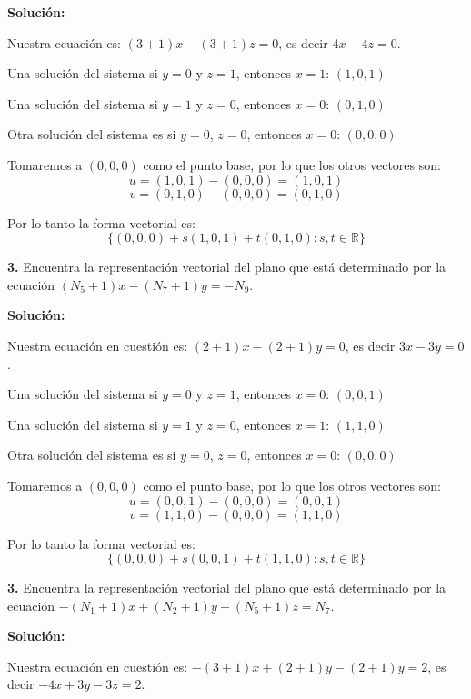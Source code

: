 \documentclass{article}
\begin{document}
\textbf{Solución:}
\vspace{10pt}

Nuestra ecuación es: $(3 +1)x-(3 +1)z = 0$, es decir $4x-4z = 0$.


Una solución del sistema si $y = 0$  y $z = 1$, entonces $x =1$: $(1,0,1)$


Una solución del sistema si $y = 1$  y $z = 0$, entonces $x =0$: $(0,1,0)$


Otra solución del sistema es si $y=0$, $z = 0$, entonces $x =0$: $(0,0,0)$


Tomaremos a $(0,0,0)$ como el punto base, por lo que los otros vectores son:
$$u = (1,0,1)-(0,0,0) = (1,0,1)$$
$$v = (0,1,0)-(0,0,0) = (0,1,0)$$

Por lo tanto la forma vectorial es:
$$\{(0,0,0)+s(1,0,1)+t(0,1,0): s,t \in \mathbb{R}\}$$
\vspace{10pt}

\textbf{3.} Encuentra la representación vectorial del plano que está determinado por la ecuación 
$(N_5 + 1)x - (N_7 + 1)y = -N_9$.
\vspace{10pt}

\textbf{Solución:}
\vspace{10pt}

Nuestra ecuación en cuestión es: $(2 + 1)x - (2 + 1)y = 0$, es decir $3x-3y= 0$.
 

Una solución del sistema si $y = 0$  y $z = 1$, entonces $x =0$: $(0,0,1)$


Una solución del sistema si $y = 1$  y $z = 0$, entonces $x =1$: $(1,1,0)$


Otra solución del sistema es si $y=0$, $z = 0$, entonces $x =0$: $(0,0,0)$


Tomaremos a $(0,0,0)$ como el punto base, por lo que los otros vectores son:
$$u = (0,0,1)-(0,0,0) = (0,0,1)$$
$$v = (1,1,0)-(0,0,0) = (1,1,0)$$

Por lo tanto la forma vectorial es:
$$\{(0,0,0)+s(0,0,1)+t(1,1,0): s,t \in \mathbb{R}\}$$
\vspace{10pt}

\textbf{3.} Encuentra la representación vectorial del plano que está determinado por la ecuación 
$-(N_1 + 1)x + (N_2 + 1)y - (N_5 + 1)z = N_7$.
\vspace{10pt}

\textbf{Solución:}
\vspace{10pt}

Nuestra ecuación en cuestión es: $-(3+ 1)x + (2 + 1)y - (2 + 1)y =2$, es decir $-4x+3y-3z= 2$.
 
\end{document}
